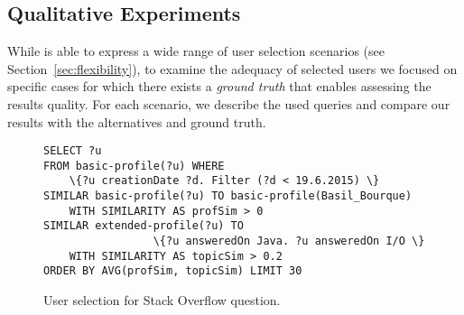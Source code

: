 \vspace{-1mm}
\subsection{Qualitative Experiments}
\label{sec:experiments}
While \qlang{} is able to express a wide range of user selection scenarios (see Section~\ref{sec:flexibility}), to examine the adequacy of selected users we focused on specific cases for which there exists a \emph{ground truth} that enables assessing the results quality. For each scenario, we describe the used queries and compare our results with the alternatives and ground truth. %

\begin{figure}
{\scriptsize
\begin{Verbatim}
SELECT ?u
FROM basic-profile(?u) WHERE
    \{?u creationDate ?d. Filter (?d < 19.6.2015) \}
SIMILAR basic-profile(?u) TO basic-profile(Basil_Bourque)
    WITH SIMILARITY AS profSim > 0
SIMILAR extended-profile(?u) TO 
                 \{?u answeredOn Java. ?u answeredOn I/O \}
    WITH SIMILARITY AS topicSim > 0.2
ORDER BY AVG(profSim, topicSim) LIMIT 30
\end{Verbatim}
} \vspace{-6mm} 
\caption{User selection for Stack Overflow
question.} \label{fig:SOquery}
\end{figure}


